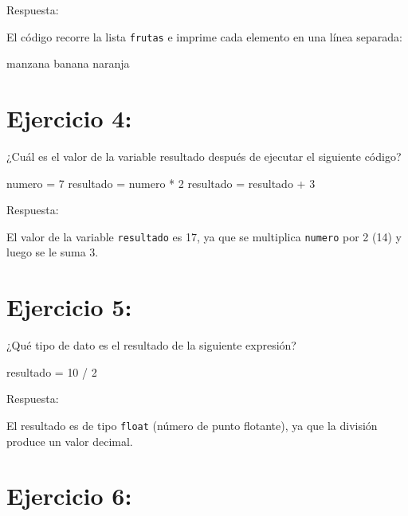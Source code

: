 \documentclass[
  a4paper,
  DIV=11,
  numbers=noendperiod,
  onepage,
  openany]{scrreprt}
\newenvironment{Shaded}{\begin{snugshade}}{\end{snugshade}}
\newcommand{\DecValTok}[1]{\textcolor[rgb]{0.68,0.00,0.00}{#1}}
\newcommand{\NormalTok}[1]{\textcolor[rgb]{0.00,0.23,0.31}{#1}}
\newcommand{\OperatorTok}[1]{\textcolor[rgb]{0.37,0.37,0.37}{#1}}
\begin{document}
Respuesta:

El código recorre la lista \texttt{frutas} e imprime cada elemento en
una línea separada:

\begin{Shaded}
\begin{Highlighting}[]
\NormalTok{manzana}
\NormalTok{banana}
\NormalTok{naranja}
\end{Highlighting}
\end{Shaded}

\chapter{Ejercicio 4:}\label{ejercicio-4}

¿Cuál es el valor de la variable resultado después de ejecutar el
siguiente código?

\begin{Shaded}
\begin{Highlighting}[]
\NormalTok{numero }\OperatorTok{=} \DecValTok{7}
\NormalTok{resultado }\OperatorTok{=}\NormalTok{ numero }\OperatorTok{*} \DecValTok{2}
\NormalTok{resultado }\OperatorTok{=}\NormalTok{ resultado }\OperatorTok{+} \DecValTok{3}
\end{Highlighting}
\end{Shaded}

Respuesta:

El valor de la variable \texttt{resultado} es 17, ya que se multiplica
\texttt{numero} por 2 (14) y luego se le suma 3.

\chapter{Ejercicio 5:}\label{ejercicio-5}

¿Qué tipo de dato es el resultado de la siguiente expresión?

\begin{Shaded}
\begin{Highlighting}[]
\NormalTok{resultado }\OperatorTok{=} \DecValTok{10} \OperatorTok{/} \DecValTok{2}
\end{Highlighting}
\end{Shaded}

Respuesta:

El resultado es de tipo \texttt{float} (número de punto flotante), ya
que la división produce un valor decimal.

\chapter{Ejercicio 6:}\label{ejercicio-6}
\end{document}
